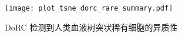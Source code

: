 \begin{figure}[!htbp]
    \centering
    \texttt{[image: plot\_tsne\_dorc\_rare\_summary.pdf]}
    \caption{
    DoRC 检测到人类血液树突状稀有细胞的异质性
    }
    \label{fig:dorc_dendritic}
\end{figure}

